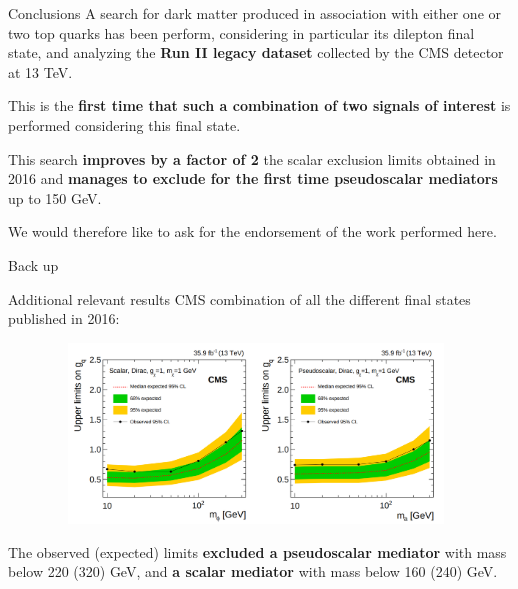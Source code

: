 \documentclass[8pt]{beamer}
\newcommand{\backupbegin}{
   \newcounter{finalframe}
   \setcounter{finalframe}{\value{framenumber}}
}
\begin{document}
\begin{frame}{Conclusions}
\justifying
A search for \alert{dark matter produced in association with either one or two top quarks} has been perform, considering in particular its dilepton final state, and analyzing the \textbf{Run II legacy dataset} collected by the CMS detector at 13 TeV. \vfill

This is the \textbf{first time that such a combination of two signals of interest} is performed considering this final state. \vfill

This search \textbf{improves by a factor of 2} the scalar exclusion limits obtained in 2016 and \textbf{manages to exclude for the first time pseudoscalar mediators} up to 150 GeV. \vfill

We would therefore like to ask for the endorsement of the work performed here. \vfill
\end{frame}

























\backupbegin

\begin{frame}[standout]
Back up
\end{frame}

\begin{frame}{Additional relevant results}
\justifying
CMS combination of all the different final states published in 2016:

\begin{figure}[htbp]
\begin{center}
\includegraphics[width=11cm, height=4.8cm]{figs/CMSttbarExclusion.png}
\end{center}
\end{figure} \vfill

The observed (expected) limits \textbf{excluded a pseudoscalar mediator} with mass below 220 (320) GeV, and \textbf{a scalar mediator} with mass below 160 (240) GeV. \vfill
\end{frame}
\end{document}
